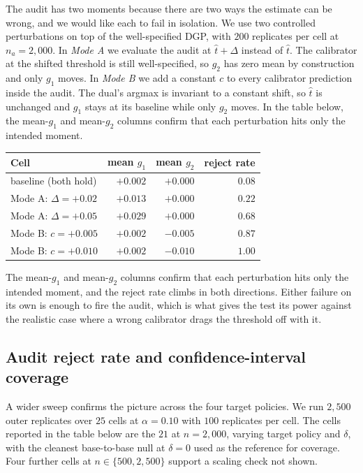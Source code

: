 \documentclass[11pt]{article}
\begin{document}
The audit has two moments because there are two ways the estimate can be wrong, and we would like each to fail in isolation. We use two controlled perturbations on top of the well-specified DGP, with $200$ replicates per cell at $n_a = 2{,}000$. In \emph{Mode A} we evaluate the audit at $\hat t + \Delta$ instead of $\hat t$. The calibrator at the shifted threshold is still well-specified, so $g_2$ has zero mean by construction and only $g_1$ moves. In \emph{Mode B} we add a constant $c$ to every calibrator prediction inside the audit. The dual's argmax is invariant to a constant shift, so $\hat t$ is unchanged and $g_1$ stays at its baseline while only $g_2$ moves. In the table below, the mean-$g_1$ and mean-$g_2$ columns confirm that each perturbation hits only the intended moment.

\begin{table}[H]
\centering
\setlength{\tabcolsep}{8pt}
\begin{tabular}{lrrr}
\toprule
Cell & mean $g_1$ & mean $g_2$ & reject rate \\
\midrule
baseline (both hold)                & $+0.002$ & $+0.000$ & $0.08$ \\
Mode A: $\Delta = +0.02$             & $+0.013$ & $+0.000$ & $0.22$ \\
Mode A: $\Delta = +0.05$             & $+0.029$ & $+0.000$ & $0.68$ \\
Mode B: $c = +0.005$                 & $+0.002$ & $-0.005$ & $0.87$ \\
Mode B: $c = +0.010$                 & $+0.002$ & $-0.010$ & $1.00$ \\
\bottomrule
\end{tabular}
\end{table}

The mean-$g_1$ and mean-$g_2$ columns confirm that each perturbation hits only the intended moment, and the reject rate climbs in both directions. Either failure on its own is enough to fire the audit, which is what gives the test its power against the realistic case where a wrong calibrator drags the threshold off with it.

\subsection{Audit reject rate and confidence-interval coverage}
\label{app:semi-synth-mc}

A wider sweep confirms the picture across the four target policies. We run $2{,}500$ outer replicates over $25$ cells at $\alpha = 0.10$ with $100$ replicates per cell. The cells reported in the table below are the $21$ at $n = 2{,}000$, varying target policy and $\delta$, with the cleanest base-to-base null at $\delta = 0$ used as the reference for coverage. Four further cells at $n \in \{500, 2{,}500\}$ support a scaling check not shown.
\end{document}
